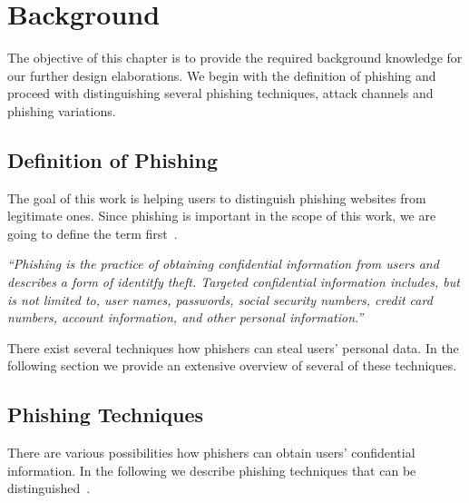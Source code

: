 \section{Background}
\label{s:background}
The objective of this chapter is to provide the required background knowledge for our further design elaborations. We begin with the definition of phishing and proceed with distinguishing several phishing techniques, attack channels and phishing variations.
\subsection{Definition of Phishing}
\label{s:phishing_def}
The goal of this work is helping users to distinguish phishing websites from legitimate ones. Since phishing is important in the scope of this work, we are going to define the term first~\cite{jakobsson2006phishing}. 

\begin{center}
\textit{``Phishing is the practice of obtaining confidential information from users and describes a form of identitfy theft. Targeted confidential information includes, but is not limited to, user names, passwords, social security numbers, credit card numbers, account information, and other personal information.''}
\end{center}

There exist several techniques how phishers can steal users' personal data. In the following section we provide an extensive overview of several of these techniques.

\subsection{Phishing Techniques}
\label{s:phishing_techs}
There are various possibilities how phishers can obtain users' confidential information. In the following we describe phishing techniques that can be distinguished~\cite{jakobsson2006phishing}.

